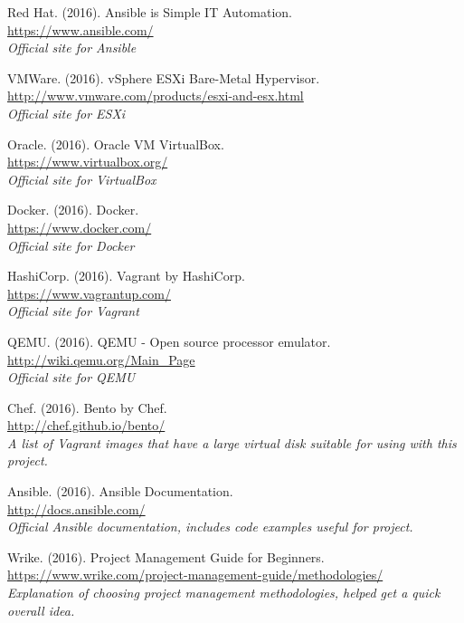 \documentclass[12pt,a4paper]{report}
\begin{document}
\begin{thebibliography}{9}
Red Hat. (2016). Ansible is Simple IT Automation.
\\\url{https://www.ansible.com/}
\\\textit{Official site for Ansible}

VMWare. (2016). vSphere ESXi Bare-Metal Hypervisor.
\\\url{http://www.vmware.com/products/esxi-and-esx.html}
\\\textit{Official site for ESXi}

Oracle. (2016). Oracle VM VirtualBox.
\\\url{https://www.virtualbox.org/}
\\\textit{Official site for VirtualBox}

Docker. (2016). Docker.
\\\url{https://www.docker.com/}
\\\textit{Official site for Docker}

HashiCorp. (2016). Vagrant by HashiCorp.
\\\url{https://www.vagrantup.com/}
\\\textit{Official site for Vagrant}

QEMU. (2016). QEMU - Open source processor emulator.
\\\url{http://wiki.qemu.org/Main_Page}
\\\textit{Official site for QEMU}

Chef. (2016). Bento by Chef.
\\\url{http://chef.github.io/bento/}
\\\textit{A list of Vagrant images that have a large virtual disk suitable for using with this project.}

Ansible. (2016). Ansible Documentation.
\\\url{http://docs.ansible.com/}
\\\textit{Official Ansible documentation, includes code examples useful for project.}

Wrike. (2016). Project Management Guide for Beginners.
\\\url{https://www.wrike.com/project-management-guide/methodologies/}
\\\textit{Explanation of choosing project management methodologies, helped get a quick overall idea.}

\end{thebibliography}
\end{document}
